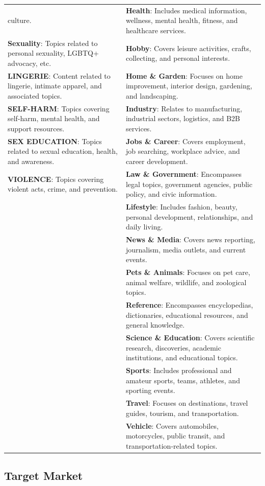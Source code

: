 \documentclass[
  titlepage]{article}
\begin{document}
\begin{longtable}[]{@{}
  >{\raggedright\arraybackslash}p{}
  >{\raggedright\arraybackslash}p{}@{}}
culture. & \textbf{Health}: Includes medical information, wellness,
mental health, fitness, and healthcare services. \\
\textbf{Sexuality}: Topics related to personal sexuality, LGBTQ+
advocacy, etc. & \textbf{Hobby}: Covers leisure activities, crafts,
collecting, and personal interests. \\
\textbf{LINGERIE}: Content related to lingerie, intimate apparel, and
associated topics. & \textbf{Home \& Garden}: Focuses on home
improvement, interior design, gardening, and landscaping. \\
\textbf{SELF-HARM}: Topics covering self-harm, mental health, and
support resources. & \textbf{Industry}: Relates to manufacturing,
industrial sectors, logistics, and B2B services. \\
\textbf{SEX EDUCATION}: Topics related to sexual education, health, and
awareness. & \textbf{Jobs \& Career}: Covers employment, job searching,
workplace advice, and career development. \\
\textbf{VIOLENCE}: Topics covering violent acts, crime, and prevention.
& \textbf{Law \& Government}: Encompasses legal topics, government
agencies, public policy, and civic information. \\
& \textbf{Lifestyle}: Includes fashion, beauty, personal development,
relationships, and daily living. \\
& \textbf{News \& Media}: Covers news reporting, journalism, media
outlets, and current events. \\
& \textbf{Pets \& Animals}: Focuses on pet care, animal welfare,
wildlife, and zoological topics. \\
& \textbf{Reference}: Encompasses encyclopedias, dictionaries,
educational resources, and general knowledge. \\
& \textbf{Science \& Education}: Covers scientific research,
discoveries, academic institutions, and educational topics. \\
& \textbf{Sports}: Includes professional and amateur sports, teams,
athletes, and sporting events. \\
& \textbf{Travel}: Focuses on destinations, travel guides, tourism, and
transportation. \\
& \textbf{Vehicle}: Covers automobiles, motorcycles, public transit, and
transportation-related topics. \\
\end{longtable}

\subsection{Target Market}\label{target-market}
\end{document}

